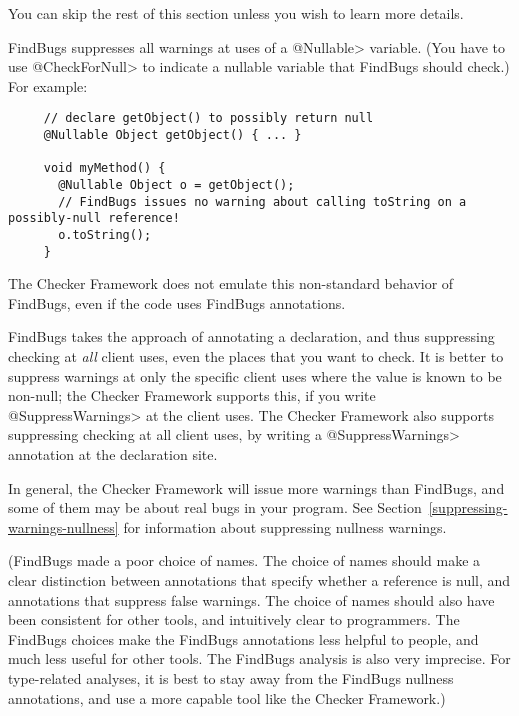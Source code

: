 You can skip the rest of this section unless you wish to learn more details.

FindBugs suppresses all warnings at uses of a \<@Nullable> variable.
(You have to use \<@CheckForNull> to
indicate a nullable variable that FindBugs should check.)  For example:

\begin{Verbatim}
     // declare getObject() to possibly return null
     @Nullable Object getObject() { ... }

     void myMethod() {
       @Nullable Object o = getObject();
       // FindBugs issues no warning about calling toString on a possibly-null reference!
       o.toString();
     }
\end{Verbatim}

\noindent
The Checker Framework does not emulate this non-standard behavior of
FindBugs, even if the code uses FindBugs annotations.

FindBugs takes the approach of annotating a declaration, and thus
suppressing checking at \emph{all} client uses, even the places that you
want to check.
It is better to suppress warnings at only the specific client uses
where the value is known to be non-null; the Checker Framework supports
this, if you write \<@SuppressWarnings> at the client uses.
The Checker Framework also supports suppressing checking at all client uses,
by writing a \<@SuppressWarnings> annotation at the declaration site.

In general, the Checker Framework will issue more warnings than FindBugs,
and some of them may be about real bugs in your program.
See Section~\ref{suppressing-warnings-nullness} for information about
suppressing nullness warnings.

(FindBugs made a poor choice of names.  The choice of names should make a
clear distinction between annotations that specify whether a reference is
null, and annotations that suppress false warnings.  The choice of names
should also have been consistent for other tools, and intuitively clear to
programmers.  The FindBugs choices make the FindBugs annotations less
helpful to people, and much less useful for other tools.  The FindBugs
analysis is also very imprecise.  For type-related analyses, it is best to
stay away from the FindBugs nullness annotations, and use a more capable
tool like the Checker Framework.)



